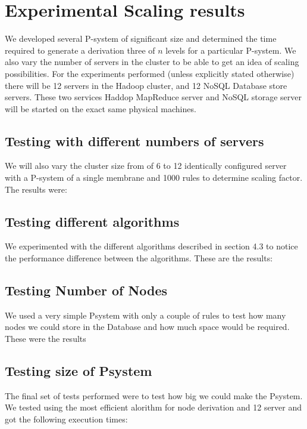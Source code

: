 \documentclass[runningheads]{llncs}
\begin{document}
\section{Experimental Scaling results}

We developed several P-system of significant size and determined the time required to generate a derivation three of $n$ levels for a particular P-system. We also vary the number of servers in the cluster to be able to get an idea of scaling possibilities. For the experiments performed (unless explicitly stated otherwise) there will be 12 servers in the Hadoop cluster, and 12 NoSQL Database store servers. These two services Haddop MapReduce server and NoSQL storage server will be started on the exact same physical machines.   

\subsection{Testing with different numbers of servers}

We will also vary the cluster size from of 6 to 12 identically configured server with a P-system of a single membrane and 1000 rules to determine scaling factor. The results were:

\subsection{Testing different algorithms}

We experimented with the different algorithms described in section 4.3 to notice the performance difference between the algorithms. These are the results:

\subsection{Testing Number of Nodes}

We used a very simple Psystem with only a couple of rules to test how many nodes we could store in the Database and how much space would be required. These were the results

\subsection{Testing size of Psystem}

The final set of tests performed were to test how big we could make the Psystem. We tested using the most efficient alorithm for node derivation and 12 server and got the following execution times: 
\end{document}

